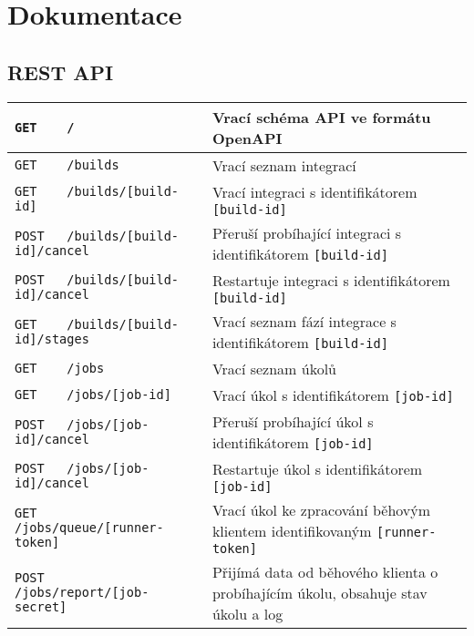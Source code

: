 \chapter{Dokumentace}

\section{REST API}



\begin{sidewaystable}[h]
\fontsize{8.3}{10}\selectfont
\centering
\begin{tabular}{|l|l|}
\hline
\verb|GET    /|                                          & Vrací schéma API ve formátu OpenAPI \\ \hline
\verb|GET    /builds|                                    & Vrací seznam integrací \\ \hline
\verb|GET    /builds/[build-id]|                         & Vrací integraci s identifikátorem \verb|[build-id]| \\ \hline
\verb|POST   /builds/[build-id]/cancel|                  & Přeruší probíhající integraci s identifikátorem \verb|[build-id]| \\ \hline
\verb|POST   /builds/[build-id]/cancel|                  & Restartuje integraci s identifikátorem \verb|[build-id]| \\ \hline
\verb|GET    /builds/[build-id]/stages|                  & Vrací seznam fází integrace s identifikátorem \verb|[build-id]| \\ \hline
\verb|GET    /jobs|                                      & Vrací seznam úkolů \\ \hline
\verb|GET    /jobs/[job-id]|                             & Vrací úkol s identifikátorem \verb|[job-id]| \\ \hline
\verb|POST   /jobs/[job-id]/cancel|                      & Přeruší probíhající úkol s identifikátorem \verb|[job-id]| \\ \hline
\verb|POST   /jobs/[job-id]/cancel|                      & Restartuje úkol s identifikátorem \verb|[job-id]| \\ \hline
\verb|GET    /jobs/queue/[runner-token]|                 & Vrací úkol ke zpracování běhovým klientem identifikovaným \verb|[runner-token]| \\ \hline
\verb|POST   /jobs/report/[job-secret]|                  & Přijímá data od běhového klienta o probíhajícím úkolu, obsahuje stav úkolu a log \\ \hline

\end{tabular}
\end{sidewaystable}
